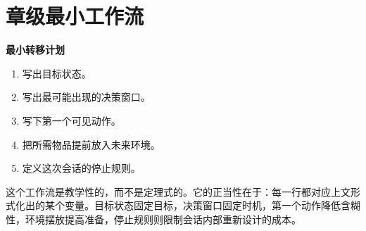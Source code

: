 \section{章级最小工作流}

\begin{templatebox}
\textbf{最小转移计划}
\begin{enumerate}[nosep]
  \item 写出目标状态。
  \item 写出最可能出现的决策窗口。
  \item 写下第一个可见动作。
  \item 把所需物品提前放入未来环境。
  \item 定义这次会话的停止规则。
\end{enumerate}
\end{templatebox}

\begin{remark}
这个工作流是教学性的，而不是定理式的。它的正当性在于：每一行都对应上文形式化出的某个变量。目标状态固定目标，决策窗口固定时机，第一个动作降低含糊性，环境摆放提高准备，停止规则则限制会话内部重新设计的成本。
\end{remark}